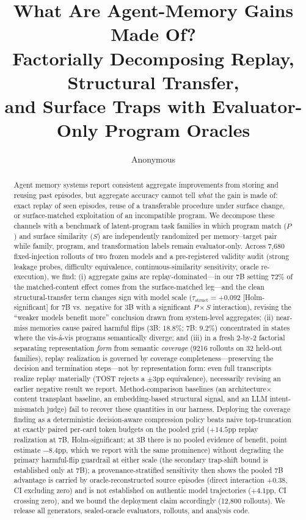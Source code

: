 \documentclass{article} %
\title{What Are Agent-Memory Gains Made Of?\\ Factorially Decomposing Replay, Structural Transfer,\\ and Surface Traps with Evaluator-Only Program Oracles}
\author{Anonymous}
\newcommand{\taustruct}{\tau_{\mathrm{struct}}}
\begin{document}
\maketitle

\begin{abstract}
Agent memory systems report consistent aggregate improvements from storing and reusing past episodes, but aggregate accuracy cannot tell \emph{what} the gain is made of: exact replay of seen episodes, reuse of a transferable procedure under surface change, or surface-matched exploitation of an incompatible program. We decompose these channels with a benchmark of latent-program task families in which program match ($P$) and surface similarity ($S$) are independently randomized per memory--target pair while family, program, and transformation labels remain evaluator-only. Across 7{,}680 fixed-injection rollouts of two frozen models and a pre-registered validity audit (strong leakage probes, difficulty equivalence, continuous-similarity sensitivity, oracle re-execution), we find: (i) aggregate gains are replay-dominated---in our 7B setting $72\%$ of the matched-content effect comes from the surface-matched leg---and the clean structural-transfer term changes sign with model scale ($\taustruct = +0.092$ [Holm-significant] for 7B vs.\ negative for 3B with a significant $P\times S$ interaction), revising the ``weaker models benefit more'' conclusion drawn from system-level aggregates; (ii) near-miss memories cause paired harmful flips (3B: $18.8\%$; 7B: $9.2\%$) concentrated in states where the vis-\'a-vis programs semantically diverge; and (iii) in a fresh 2-by-2 factorial separating representation \emph{form} from semantic \emph{coverage} (9216 rollouts on 32 held-out families), replay realization is governed by coverage completeness---preserving the decision and termination steps---not by representation form: even full transcripts realize replay materially (TOST rejects a $\pm3$pp equivalence), necessarily revising an earlier negative result we report. Method-comparison baselines (an architecture$\times$content transplant baseline, an embedding-based structural signal, and an LLM intent-mismatch judge) fail to recover these quantities in our harness. Deploying the coverage finding as a deterministic decision-aware compression policy beats naive top-truncation at exactly paired per-card token budgets on the pooled grid ($+14.5$pp replay realization at 7B, Holm-significant; at 3B there is no pooled evidence of benefit, point estimate $-8.4$pp, which we report with the same prominence) without degrading the primary harmful-flip guardrail at either scale (the secondary trap-shift bound is established only at 7B); a provenance-stratified sensitivity then shows the pooled 7B advantage is carried by oracle-reconstructed source episodes (direct interaction $+0.38$, CI excluding zero) and is not established on authentic model trajectories ($+4.1$pp, CI crossing zero), and we bound the deployment claim accordingly (12{,}800 rollouts). We release all generators, sealed-oracle evaluators, rollouts, and analysis code.
\end{abstract}
\end{document}
